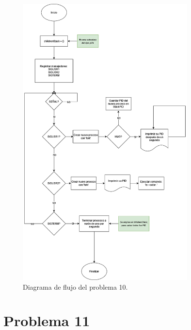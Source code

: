 \documentclass[letterpaper, 10 pt, conference]{ieeeconf}  %
\begin{document}
\begin{figure}[tb]
  \centering
  \includegraphics[width=0.8\textwidth]{./diagrama_flujo_tp2_p10.png}
  \caption{Diagrama de flujo del problema 10.}
  \label{fig:diag_flujo_p10}
\end{figure}

\section{Problema 11}
\end{document}
